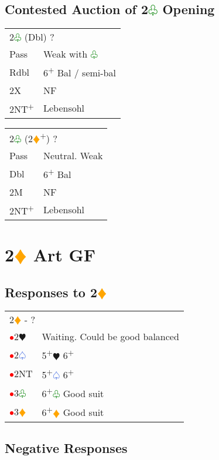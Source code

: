 \documentclass{article}
\renewcommand{\sp}{\textcolor{RoyalBlue}{$\varspade$}}
\newcommand{\he}{\textcolor{RubineRed}{$\varheart$}}
\newcommand{\di}{\textcolor{Orange}{$\vardiamond$}}
\newcommand{\cl}{\textcolor{Green}{$\varclub$}}
\newcommand{\nt}{\relsize{-1}NT\relsize{1}}
\newcommand{\up}{\textsuperscript{+}}
\newcommand{\al}{\textcolor{red}{$\bullet$}}
\begin{document}
\subsection{Contested Auction of 2\cl{} Opening}

\begin{tabular}{|l|p{6.5cm}}
	\multicolumn{2}{l}{2\cl{} (Dbl) ?}\\
	Pass & Weak with \cl{} \\
	Rdbl & 6\up{} Bal / semi-bal \\
	2X & NF \\
	2\nt{}\up{} & Lebensohl \\
\end{tabular}

\medskip

\begin{tabular}{|l|p{6.5cm}}
	\multicolumn{2}{l}{2\cl{} (2\di{}\up{}) ?}\\
	Pass & Neutral. Weak \\
	Dbl & 6\up{} Bal \\
	2M & NF \\
	2\nt{}\up{} & Lebensohl \\
\end{tabular}


\section{2\di{} Art GF}

\subsection{Responses to 2\di{}}

\begin{tabular}{|l|p{6.5cm}}
	\multicolumn{2}{l}{2\di{} - ?}\\
	\al{}2\he{} & Waiting. Could be good balanced \\
	\al{}2\sp{} & 5\up{}\he{} 6\up{} \\
	\al{}2\nt{} & 5\up{}\sp{} 6\up{} \\
	\al{}3\cl{} & 6\up{}\cl{} Good suit \\
	\al{}3\di{} & 6\up{}\di{} Good suit \\
\end{tabular}

\subsection{Negative Responses}
\end{document}
